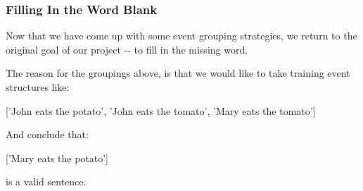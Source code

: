 \documentclass[11pt]{article}
\newenvironment{Shaded}{}{}
\newcommand{\StringTok}[1]{\textcolor[rgb]{0.25,0.44,0.63}{{#1}}}
\newcommand{\NormalTok}[1]{{#1}}
\begin{document}
    \subsubsection{Filling In the Word
Blank}\label{filling-in-the-word-blank}

Now that we have come up with some event grouping strategies, we return
to the original goal of our project -\/- to fill in the missing word.

The reason for the groupings above, is that we would like to take
training event structures like:

\begin{Shaded}
\begin{Highlighting}[]
\NormalTok{[}\StringTok{'John eats the potato'}\NormalTok{, }\StringTok{'John eats the tomato'}\NormalTok{, }\StringTok{'Mary eats the tomato'}\NormalTok{]}
\end{Highlighting}
\end{Shaded}

And conclude that:

\begin{Shaded}
\begin{Highlighting}[]
\NormalTok{[}\StringTok{'Mary eats the potato'}\NormalTok{]}
\end{Highlighting}
\end{Shaded}

is a valid sentence.
\end{document}
